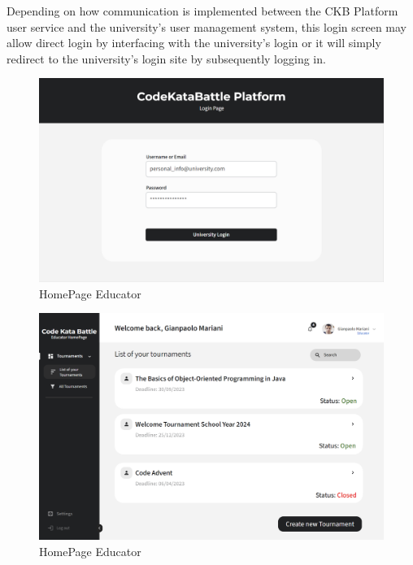 
Depending on how communication is implemented between the CKB Platform user service and the university's user management system,
this login screen may allow direct login by interfacing with the university's login or it will simply redirect to the university's login site by subsequently logging in.
\begin{figure}[H]
    \centering
    \includegraphics[width=\textwidth]{../images/login.png}
    \caption{HomePage Educator}
    \label{fig:HomePage Educator}
\end{figure}
\begin{figure}[H]
    \centering
    \includegraphics[width=\textwidth]{../images/homepage-educator.png}
    \caption{HomePage Educator}
    \label{fig:HomePage Educator}
\end{figure}
